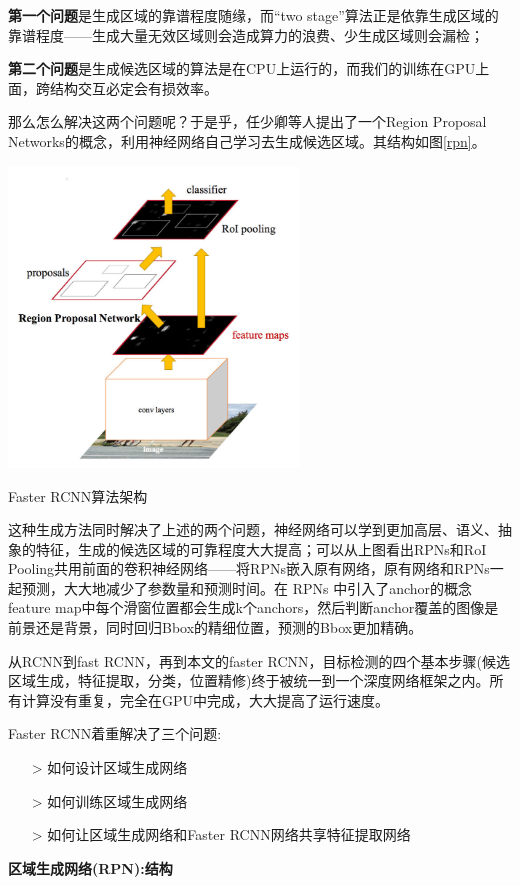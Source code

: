 \textbf{第一个问题}是生成区域的靠谱程度随缘，而“two stage”算法正是依靠生成区域的靠谱程度——生成大量无效区域则会造成算力的浪费、少生成区域则会漏检；

\textbf{第二个问题}是生成候选区域的算法是在CPU上运行的，而我们的训练在GPU上面，跨结构交互必定会有损效率。

那么怎么解决这两个问题呢？于是乎，任少卿等人提出了一个Region Proposal Networks的概念，利用神经网络自己学习去生成候选区域。其结构如图\ref{rpn}。
\begin{uscfigure}
	\includegraphics[width=\textwidth,height=8cm]{./Pictures/faster_rcnn.jpg}	
	\caption{Faster RCNN算法架构}	
	\label{rpn}
\end{uscfigure}
这种生成方法同时解决了上述的两个问题，神经网络可以学到更加高层、语义、抽象的特征，生成的候选区域的可靠程度大大提高；可以从上图看出RPNs和RoI Pooling共用前面的卷积神经网络——将RPNs嵌入原有网络，原有网络和RPNs一起预测，大大地减少了参数量和预测时间。在 RPNs 中引入了anchor的概念feature map中每个滑窗位置都会生成k个anchors，然后判断anchor覆盖的图像是前景还是背景，同时回归Bbox的精细位置，预测的Bbox更加精确。

从RCNN到fast RCNN，再到本文的faster RCNN，目标检测的四个基本步骤(候选区域生成，特征提取，分类，位置精修)终于被统一到一个深度网络框架之内。所有计算没有重复，完全在GPU中完成，大大提高了运行速度。

Faster RCNN着重解决了三个问题:
\begin{itemize}
	\item[>] 如何设计区域生成网络
	\item[>] 如何训练区域生成网络
	\item[>] 如何让区域生成网络和Faster RCNN网络共享特征提取网络
\end{itemize}

\textbf{区域生成网络(RPN):结构}

